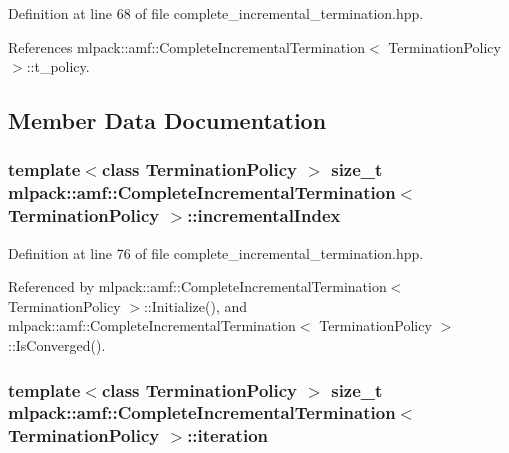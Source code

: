 Definition at line 68 of file complete\-\_\-incremental\-\_\-termination.\-hpp.



References mlpack\-::amf\-::\-Complete\-Incremental\-Termination$<$ Termination\-Policy $>$\-::t\-\_\-policy.



\subsection{Member Data Documentation}
\subsubsection[{incremental\-Index}]{\setlength{\rightskip}{0pt plus 5cm}template$<$class Termination\-Policy $>$ size\-\_\-t {\bf mlpack\-::amf\-::\-Complete\-Incremental\-Termination}$<$ Termination\-Policy $>$\-::incremental\-Index\hspace{0.3cm}{\ttfamily [private]}}\label{classmlpack_1_1amf_1_1CompleteIncrementalTermination_a134ea89b74d69c39a046beba23fe7255}


Definition at line 76 of file complete\-\_\-incremental\-\_\-termination.\-hpp.



Referenced by mlpack\-::amf\-::\-Complete\-Incremental\-Termination$<$ Termination\-Policy $>$\-::\-Initialize(), and mlpack\-::amf\-::\-Complete\-Incremental\-Termination$<$ Termination\-Policy $>$\-::\-Is\-Converged().

\subsubsection[{iteration}]{\setlength{\rightskip}{0pt plus 5cm}template$<$class Termination\-Policy $>$ size\-\_\-t {\bf mlpack\-::amf\-::\-Complete\-Incremental\-Termination}$<$ Termination\-Policy $>$\-::iteration\hspace{0.3cm}{\ttfamily [private]}}\label{classmlpack_1_1amf_1_1CompleteIncrementalTermination_a843f39ac9cd3a552e40696e30b44874d}


